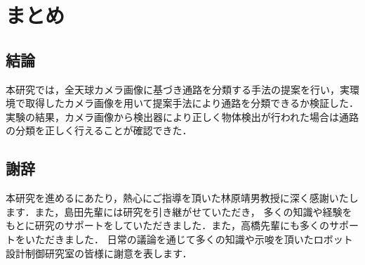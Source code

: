 \documentclass[../main]{subfiles}
\begin{document}
\setcounter{secnumdepth}{2}
    \chapter{まとめ}
        \section*{結論}
        本研究では，全天球カメラ画像に基づき通路を分類する手法の提案を行い，実環境で取得したカメラ画像を用いて提案手法により通路を分類できるか検証した．
        実験の結果，カメラ画像から検出器により正しく物体検出が行われた場合は通路の分類を正しく行えることが確認できた．

        \section*{謝辞}
        本研究を進めるにあたり，熱心にご指導を頂いた林原靖男教授に深く感謝いたします．また，島田先輩には研究を引き継がせていただき，
        多くの知識や経験をもとに研究のサポートをしていただきました．また，高橋先輩にも多くのサポートをいただきました．
        日常の議論を通じて多くの知識や示唆を頂いたロボット設計制御研究室の皆様に謝意を表します．
\end{document}
